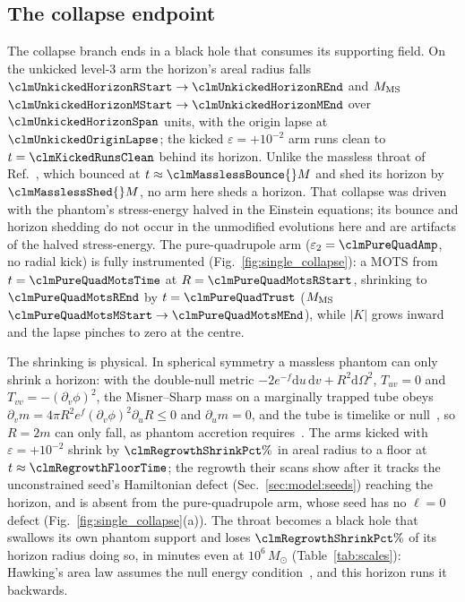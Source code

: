\documentclass[twocolumn,floatfix,aps,prd,superscriptaddress,nofootinbib]{revtex4-2}
\begin{document}
\subsection{The collapse endpoint}
\label{sec:single:collapse}

The collapse branch ends in a black hole that consumes its supporting field. On the unkicked level-3 arm the horizon's areal radius falls $\clmUnkickedHorizonRStart\to\clmUnkickedHorizonREnd$ and $M_{\rm MS}$ $\clmUnkickedHorizonMStart\to\clmUnkickedHorizonMEnd$ over $\clmUnkickedHorizonSpan$ units, with the origin lapse at $\clmUnkickedOriginLapse$; the kicked $\varepsilon=+10^{-2}$ arm runs clean to $t=\clmKickedRunsClean$ behind its horizon. Unlike the massless throat of Ref.~\cite{shirokov2026}, which bounced at $t\approx\clmMasslessBounce{}M$ and shed its horizon by $\clmMasslessShed{}M$, no arm here sheds a horizon. That collapse was driven with the phantom's stress-energy halved in the Einstein equations; its bounce and horizon shedding do not occur in the unmodified evolutions here and are artifacts of the halved stress-energy. The pure-quadrupole arm ($\varepsilon_2=\clmPureQuadAmp$, no radial kick) is fully instrumented (Fig.~\ref{fig:single_collapse}): a MOTS from $t=\clmPureQuadMotsTime$ at $R=\clmPureQuadMotsRStart$, shrinking to $\clmPureQuadMotsREnd$ by $t=\clmPureQuadTrust$ ($M_{\rm MS}$ $\clmPureQuadMotsMStart\to\clmPureQuadMotsMEnd$), while $|K|$ grows inward and the lapse pinches to zero at the centre.

The shrinking is physical. In spherical symmetry a massless phantom can only shrink a horizon: with the double-null metric $-2e^{-f}\mathrm{d}u\,\mathrm{d}v+R^2\mathrm{d}\Omega^2$, $T_{uv}=0$ and $T_{vv}=-(\partial_v\phi)^2$, the Misner--Sharp mass on a marginally trapped tube obeys $\partial_v m=4\pi R^2e^{f}(\partial_v\phi)^2\partial_uR\le0$ and $\partial_u m=0$, and the tube is timelike or null~\cite{hayward1996,hayward1994}, so $R=2m$ can only fall, as phantom accretion requires~\cite{babichev2004,gao2008}. The arms kicked with $\varepsilon=+10^{-2}$ shrink by $\clmRegrowthShrinkPct\%$ in areal radius to a floor at $t\approx\clmRegrowthFloorTime$; the regrowth their scans show after it tracks the unconstrained seed's Hamiltonian defect (Sec.~\ref{sec:model:seeds}) reaching the horizon, and is absent from the pure-quadrupole arm, whose seed has no $\ell=0$ defect (Fig.~\ref{fig:single_collapse}(a)). The throat becomes a black hole that swallows its own phantom support and loses $\clmRegrowthShrinkPct\%$ of its horizon radius doing so, in minutes even at $10^{6}\,M_\odot$ (Table~\ref{tab:scales}): Hawking's area law assumes the null energy condition~\cite{hawking1971,ashtekar_krishnan2004}, and this horizon runs it backwards.
\end{document}
